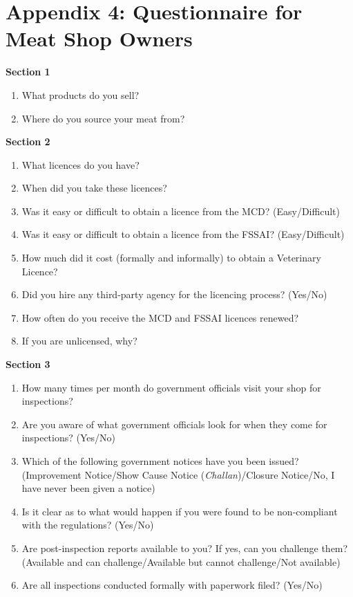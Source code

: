 \documentclass[a4paper, 12pt]{article}
\begin{document}
\section*{Appendix 4: Questionnaire for Meat Shop Owners}
\begin{mdframed}[backgroundcolor=gray!20]
\textbf {Section 1}
\begin{enumerate}[noitemsep]
\item What products do you sell?
\item Where do you source your meat from?
\end{enumerate}
\textbf {Section 2}
\begin{enumerate}[noitemsep]
\item What licences do you have?
\item When did you take these licences?
\item Was it easy or difficult to obtain a licence from the MCD? (Easy/Difficult)
\item Was it easy or difficult to obtain a licence from the FSSAI? (Easy/Difficult)
\item How much did it cost (formally and informally) to obtain a Veterinary Licence?
\item Did you hire any third-party agency for the licencing process? (Yes/No)
\item How often do you receive the MCD and FSSAI licences renewed?
\item If you are unlicensed, why?
\end{enumerate}
\textbf {Section 3}
\begin{enumerate}[noitemsep]
\item How many times per month do government officials visit your shop for inspections?
\item Are you aware of what government officials look for when they come for inspections? (Yes/No)
\item Which of the following government notices have you been issued? (Improvement Notice/Show Cause Notice (\textit{Challan})/Closure Notice/No, I have never been given a notice)
\item Is it clear as to what would happen if you were found to be non-compliant with the regulations? (Yes/No)
\item Are post-inspection reports available to you? If yes, can you challenge them? (Available and can challenge/Available but cannot challenge/Not available)
\item Are all inspections conducted formally with paperwork filed? (Yes/No)

\end{enumerate}
\end{mdframed}
\end{document}

